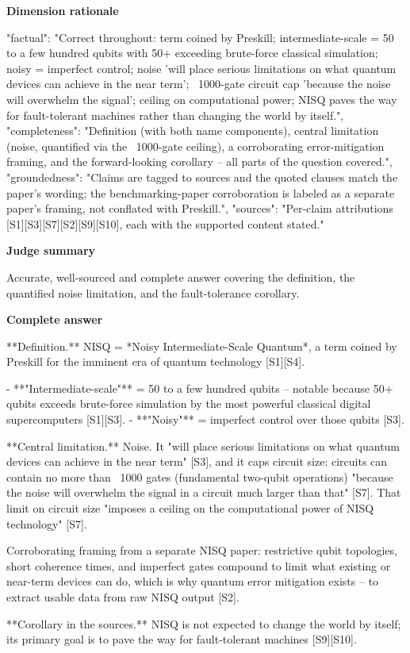 \documentclass[10pt]{article}
\begin{document}
\textbf{Dimension rationale}
\begin{EvidenceText}
{
  "factual": "Correct throughout: term coined by Preskill; intermediate-scale = 50 to a few hundred qubits with 50+ exceeding brute-force classical simulation; noisy = imperfect control; noise 'will place serious limitations on what quantum devices can achieve in the near term'; ~1000-gate circuit cap 'because the noise will overwhelm the signal'; ceiling on computational power; NISQ paves the way for fault-tolerant machines rather than changing the world by itself.",
  "completeness": "Definition (with both name components), central limitation (noise, quantified via the ~1000-gate ceiling), a corroborating error-mitigation framing, and the forward-looking corollary -- all parts of the question covered.",
  "groundedness": "Claims are tagged to sources and the quoted clauses match the paper's wording; the benchmarking-paper corroboration is labeled as a separate paper's framing, not conflated with Preskill.",
  "sources": "Per-claim attributions [S1][S3][S7][S2][S9][S10], each with the supported content stated."
}
\end{EvidenceText}

\textbf{Judge summary}
\begin{EvidenceText}
Accurate, well-sourced and complete answer covering the definition, the quantified noise limitation, and the fault-tolerance corollary.
\end{EvidenceText}

\textbf{Complete answer}
\begin{AnswerText}
**Definition.** NISQ = *Noisy Intermediate-Scale Quantum*, a term coined by Preskill for the imminent era of quantum technology [S1][S4].

- **"Intermediate-scale"** = 50 to a few hundred qubits -- notable because 50+ qubits exceeds brute-force simulation by the most powerful classical digital supercomputers [S1][S3].
- **"Noisy"** = imperfect control over those qubits [S3].

**Central limitation.** Noise. It "will place serious limitations on what quantum devices can achieve in the near term" [S3], and it caps circuit size: circuits can contain no more than ~1000 gates (fundamental two-qubit operations) "because the noise will overwhelm the signal in a circuit much larger than that" [S7]. That limit on circuit size "imposes a ceiling on the computational power of NISQ technology" [S7].

Corroborating framing from a separate NISQ paper: restrictive qubit topologies, short coherence times, and imperfect gates compound to limit what existing or near-term devices can do, which is why quantum error mitigation exists -- to extract usable data from raw NISQ output [S2].

**Corollary in the sources.** NISQ is not expected to change the world by itself; its primary goal is to pave the way for fault-tolerant machines [S9][S10].
\end{AnswerText}
\end{document}
